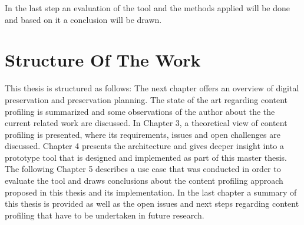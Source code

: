 In the last step an evaluation of the tool and the methods applied will be done and based on it a conclusion will be drawn.

\section{Structure Of The Work}
This thesis is structured as follows: The next chapter offers an overview of digital preservation and preservation planning. The state of the art regarding content profiling is summarized and some observations of the author about the the current related work are discussed. In Chapter 3, a theoretical view of content profiling is presented, where its requirements, issues and open challenges are discussed. Chapter 4 presents the architecture and gives deeper insight into a prototype tool that is designed and implemented as part of this master thesis. The following Chapter 5 describes a use case that was conducted in order to evaluate the tool and draws conclusions about the content profiling approach proposed in this thesis and its implementation. In the last chapter a summary of this thesis is provided as well as the open issues and next steps regarding content profiling that have to be undertaken in future research.